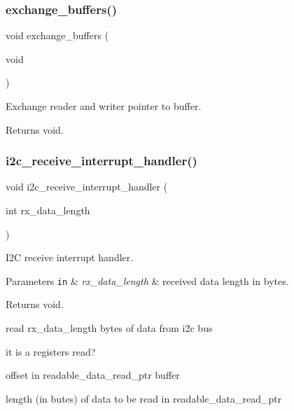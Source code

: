 \subsubsection{\texorpdfstring{exchange\+\_\+buffers()}{exchange\_buffers()}}
{\footnotesize\ttfamily void exchange\+\_\+buffers (\begin{DoxyParamCaption}\item[{void}]{ }\end{DoxyParamCaption})}



Exchange reader and writer pointer to buffer. 

\begin{DoxyReturn}{Returns}
void. 
\end{DoxyReturn}
\mbox{\label{i2c-th_8ino_a6e27532df66f6bf186654355def5c9af}} 
\subsubsection{\texorpdfstring{i2c\+\_\+receive\+\_\+interrupt\+\_\+handler()}{i2c\_receive\_interrupt\_handler()}}
{\footnotesize\ttfamily void i2c\+\_\+receive\+\_\+interrupt\+\_\+handler (\begin{DoxyParamCaption}\item[{int}]{rx\+\_\+data\+\_\+length }\end{DoxyParamCaption})}



I2C receive interrupt handler. 


\begin{DoxyParams}[1]{Parameters}
\mbox{\tt in}  & {\em rx\+\_\+data\+\_\+length} & received data length in bytes. \\
\hline
\end{DoxyParams}
\begin{DoxyReturn}{Returns}
void. 
\end{DoxyReturn}
read rx\+\_\+data\+\_\+length bytes of data from i2c bus

it is a registers read?

offset in readable\+\_\+data\+\_\+read\+\_\+ptr buffer

length (in butes) of data to be read in readable\+\_\+data\+\_\+read\+\_\+ptr

